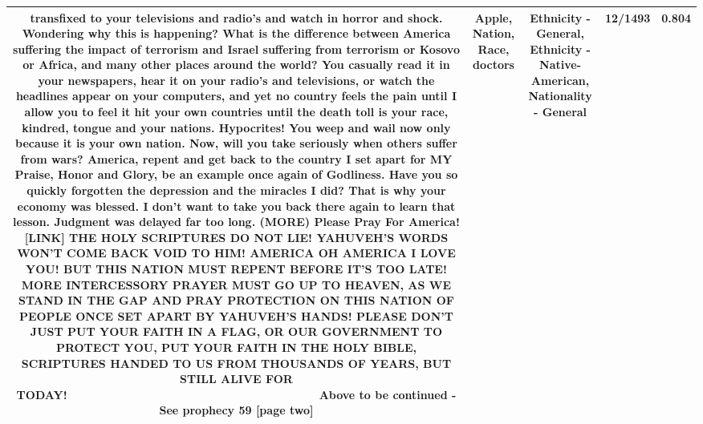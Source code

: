 \documentclass[11pt]{article}
\newlength\mylength
\begin{document}
\begin{center}
\begin{longtable}{|C{.65\mylength}|C{.30\mylength}|C{.12\mylength}|C{.12\mylength}|C{.12\mylength}|}
transfixed to your televisions and radio's and watch in horror and shock. Wondering why this is happening? What is the difference between America suffering the impact of terrorism and Israel suffering from terrorism or Kosovo or Africa, and many other places around the world? You casually read it in your newspapers, hear it on your radio's and televisions, or watch the headlines appear on your computers, and yet no country feels the pain until I allow you to feel it hit your own countries until the death toll is your \textbf{race}, kindred, tongue and your nations. Hypocrites! You weep and wail now only because it is your own \textbf{nation}. Now, will you take seriously when others suffer from wars? America, repent and get back to the country I set apart for MY Praise, Honor and Glory, be an example once again of Godliness. Have you so quickly forgotten the depression and the miracles I did? That is why your economy was blessed. I don't want to take you back there again to learn that lesson. Judgment was delayed far too long. (MORE)              Please Pray For America! [LINK] THE HOLY SCRIPTURES DO NOT LIE! YAHUVEH'S WORDS WON'T COME BACK VOID TO HIM! AMERICA OH AMERICA I LOVE YOU! BUT THIS \textbf{NATION} MUST REPENT BEFORE IT'S TOO LATE! MORE INTERCESSORY PRAYER MUST GO UP TO HEAVEN, AS WE STAND IN THE GAP AND PRAY PROTECTION ON THIS \textbf{NATION} OF PEOPLE ONCE SET APART BY YAHUVEH'S HANDS! PLEASE DON'T JUST PUT YOUR FAITH IN A FLAG, OR OUR GOVERNMENT TO PROTECT YOU, PUT YOUR FAITH IN THE HOLY BIBLE, SCRIPTURES HANDED TO US FROM THOUSANDS OF YEARS, BUT STILL ALIVE FOR TODAY!~~~~~~~~~~~~~~~~~~~~~~~~~~~~~~~~~~~~~~~Above to be continued  - See prophecy 59 [page two]\normalsize   & Apple, Nation, Race, doctors & Ethnicity - General, Ethnicity - Native-American, Nationality - General & 12/1493 & 0.804 \\  \hline

\end{longtable}
\end{center}
\end{document}
